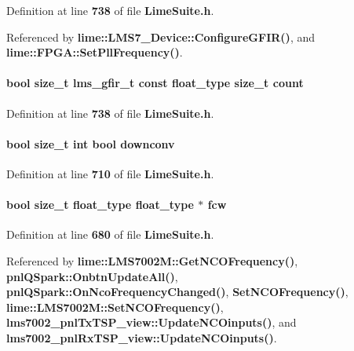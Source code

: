 Definition at line {\bf 738} of file {\bf Lime\+Suite.\+h}.



Referenced by {\bf lime\+::\+L\+M\+S7\+\_\+\+Device\+::\+Configure\+G\+F\+I\+R()}, and {\bf lime\+::\+F\+P\+G\+A\+::\+Set\+Pll\+Frequency()}.

\paragraph[{count}]{\setlength{\rightskip}{0pt plus 5cm}bool size\+\_\+t {\bf lms\+\_\+gfir\+\_\+t} const {\bf float\+\_\+type} size\+\_\+t {\bf count}}\label{group__FN__ADVANCED_ga86a6099fd14f2c337e39bf0b8da0546d}


Definition at line {\bf 738} of file {\bf Lime\+Suite.\+h}.

\paragraph[{downconv}]{\setlength{\rightskip}{0pt plus 5cm}bool size\+\_\+t {\bf int} bool downconv}\label{group__FN__ADVANCED_ga18a93efe2dba2a2ee7e687dd6e7d0d7c}


Definition at line {\bf 710} of file {\bf Lime\+Suite.\+h}.

\paragraph[{fcw}]{\setlength{\rightskip}{0pt plus 5cm}bool size\+\_\+t {\bf float\+\_\+type} {\bf float\+\_\+type} $\ast$ fcw}\label{group__FN__ADVANCED_gaa9b5e3201a9877f3475e98f944d30d6d}


Definition at line {\bf 680} of file {\bf Lime\+Suite.\+h}.



Referenced by {\bf lime\+::\+L\+M\+S7002\+M\+::\+Get\+N\+C\+O\+Frequency()}, {\bf pnl\+Q\+Spark\+::\+Onbtn\+Update\+All()}, {\bf pnl\+Q\+Spark\+::\+On\+Nco\+Frequency\+Changed()}, {\bf Set\+N\+C\+O\+Frequency()}, {\bf lime\+::\+L\+M\+S7002\+M\+::\+Set\+N\+C\+O\+Frequency()}, {\bf lms7002\+\_\+pnl\+Tx\+T\+S\+P\+\_\+view\+::\+Update\+N\+C\+Oinputs()}, and {\bf lms7002\+\_\+pnl\+Rx\+T\+S\+P\+\_\+view\+::\+Update\+N\+C\+Oinputs()}.

